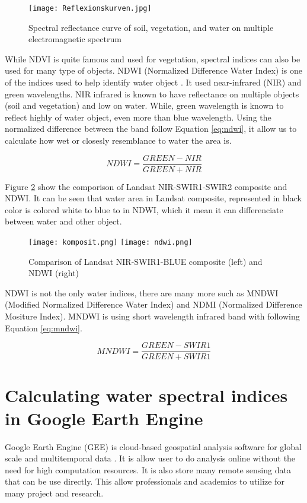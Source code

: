\begin{figure}[htbp]
	\label{fig:spectralCurve}
	\centering
	\texttt{[image: Reflexionskurven.jpg]}
	\caption{Spectral reflectance curve of soil, vegetation, and water on multiple electromagnetic spectrum \cite{siegmund2005fernes}}
\end{figure}

While NDVI is quite famous and used for vegetation, spectral indices can also be used for many type of objects. NDWI (Normalized Difference Water Index) is one of the indices used to help identify water object \cite{gao1996ndwi}. It used near-infrared (NIR) and green wavelengths. NIR infrared is known to have reflectance on multiple objects (soil and vegetation) and low on water. While, green wavelength is known to reflect highly of water object, even more than blue wavelength. Using the normalized difference between the band follow Equation \ref{eq:ndwi}, it allow us to calculate how wet or closesly resemblance to water the area is.

\begin{equation}
	\label{eq:ndwi}
	NDWI = \frac{GREEN - NIR}{GREEN + NIR}
\end{equation}

Figure \ref{fig:ndwi} show the comporison of Landsat NIR-SWIR1-SWIR2 composite and NDWI. It can be seen that water area in Landsat composite, represented in black color is colored white to blue to in NDWI, which it mean it can differenciate between water and other object.

\begin{figure}[htbp]
	\label{fig:ndwi}
	\centering
	\texttt{[image: komposit.png]}
	\texttt{[image: ndwi.png]}
	\caption{Comparison of Landsat NIR-SWIR1-BLUE composite (left) and NDWI (right)}
\end{figure}

NDWI is not the only water indices, there are many more such as MNDWI (Modified Normalized Difference Water Index) and NDMI (Normalized Difference Mositure Index). MNDWI is using short wavelength infrared band with following Equation \ref{eq:mndwi}.

\begin{equation}
	\label{eq:mndwi}
	MNDWI = \frac{GREEN - SWIR1}{GREEN + SWIR1}
\end{equation}

\section{Calculating water spectral indices in Google Earth Engine}
Google Earth Engine (GEE) is cloud-based geospatial analysis software for global scale and multitemporal data \cite{gorelick2017google}. It is allow user to do analysis online without the need for high computation resources. It is also store many remote sensing data that can be use directly. This allow professionals and academics to utilize for many project and research.

